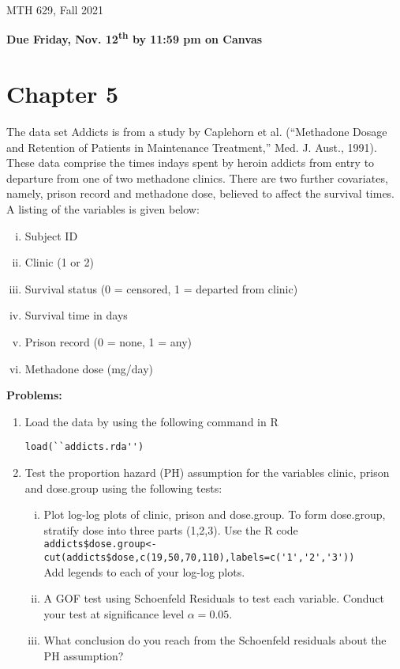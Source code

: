 \documentclass[12pt]{article}
\begin{document}
{
            \hfill {MTH 629, Fall 2021}}
\bigskip

{\bf Due Friday, Nov. 12\textsuperscript{th} by 11:59 pm on Canvas}

\section{Chapter 5}
\vspace{5pt}

The data set Addicts is from a study by Caplehorn et al. (``Methadone Dosage and Retention of Patients in Maintenance Treatment,'' Med. J. Aust., 1991). These data comprise the times indays spent by heroin addicts from entry to departure from one of two methadone clinics. There are two further covariates, namely, prison record and methadone dose, believed to affect the survival times. A listing of the variables is given below:
\begin{enumerate}[i.]
\item Subject ID
\item Clinic (1 or 2)
\item Survival status (0 = censored, 1 = departed from clinic)
\item Survival time in days
\item Prison record (0 = none, 1 = any)
\item Methadone dose (mg/day)
\end{enumerate} 

\textbf{Problems:} 
\begin{enumerate}[1.]
\item Load the data by using the following command in R

 \lstinline{load(``addicts.rda'')}
\item Test the proportion hazard (PH) assumption for the variables clinic, prison and dose.group using the following tests:
\begin{enumerate}[i.] 
\item Plot log-log plots of clinic, prison and dose.group. To form dose.group, stratify dose into three parts (1,2,3). Use the R code \\
\lstinline{addicts$dose.group<-cut(addicts$dose,c(19,50,70,110),labels=c('1','2','3'))}\\
 Add legends to each of your log-log plots. 
\item A GOF test using Schoenfeld Residuals to test each variable. Conduct your test at significance level $\alpha=0.05$. 
\item What conclusion do you reach from the Schoenfeld residuals about the PH assumption? 
\end{enumerate} 
\end{enumerate} 
\end{document}
